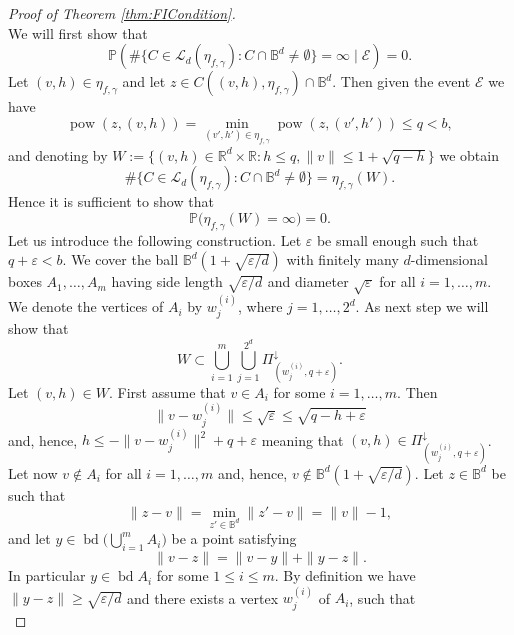 \documentclass[11pt,a4paper]{article}
\theoremstyle{plain}
\theoremstyle{definition}
\theoremstyle{remark}
\def\BB{\mathbb{B}}
\def\PP{\mathbb{P}}
\def\RR{\mathbb{R}}
\def\cL{\mathcal{L}}
\newcommand{\pow}{\mathop{\mathrm{pow}}\nolimits}
\newcommand{\bd}{\operatorname{bd}}
\begin{document}
\begin{proof}[Proof of Theorem \ref{thm:FICondition}]
\begin{equation}
    \end{equation}
    We will first show that 
    \begin{equation}\label{eq:28.05.24_1}
        \PP(\#\{C\in \cL_d(\eta_{f,\gamma}): C\cap \BB^d \neq \emptyset\}=\infty\mid \mathcal{E})=0.
    \end{equation}
    Let $(v,h)\in \eta_{f,\gamma}$ and let $z\in C((v,h),\eta_{f,\gamma})\cap \BB^d$. Then given the event $\mathcal{E}$ we have 
    \[
        \pow(z,(v,h))=\min_{(v',h')\in \eta_{f,\gamma}} \pow(z,(v',h'))\le q<b,
    \]
    and denoting by $W:=\{(v,h)\in \RR^d\times \RR\colon h\leq q, \|v\|\leq 1+\sqrt{q-h}\}$ we obtain
    \[
        \#\{C\in \cL_d(\eta_{f,\gamma}): C\cap \BB^d \neq \emptyset\}=\eta_{f,\gamma}(W).
    \]
    Hence it is sufficient to show that 
    \[
        \PP\big(\eta_{f,\gamma}(W)=\infty\big)=0.
    \] 
    Let us introduce the following construction. Let $\varepsilon$ be small enough such that $q+\varepsilon < b$. We cover the ball $\BB^d(1+\sqrt{\varepsilon/d})$ with finitely many $d$-dimensional boxes $A_1,\ldots,A_m$ having side length $\sqrt{\varepsilon/d}$ and diameter $\sqrt{\varepsilon}$ for all $i=1,\ldots,m$. We denote the vertices of $A_i$ by $w_j^{(i)}$, where $j=1,\ldots,2^d$. As next step we will show that 
    \begin{equation}\label{eq:28.05.24_2}
        W\subset \bigcup_{i=1}^m\bigcup_{j=1}^{2^d}\Pi^{\downarrow}_{(w_j^{(i)},q+\varepsilon)}.
    \end{equation}
    Let $(v,h)\in W$. First assume that $v\in A_i$ for some $i=1,\ldots,m$. Then
    \[
        \|v-w_j^{(i)}\| \le \sqrt{\varepsilon} \le \sqrt{q-h+\varepsilon}
    \]
    and, hence, $h\le -\|v-w_j^{(i)}\|^2+q+\varepsilon$ meaning that $(v,h)\in \Pi_{(w_j^{(i)},q+\varepsilon)}^\downarrow$. Let now $v\notin A_i$ for all $i=1,\ldots,m$ and, hence, $v\notin \BB^d(1+\sqrt{\varepsilon/d})$. Let $z\in \BB^d$ be such that 
    \begin{equation}\label{eq:28.05.24_3}
        \|z-v\|=\min_{z'\in\BB^d}\|z'-v\|=\|v\|-1,
    \end{equation}
    and let $y\in \bd\big(\bigcup_{i=1}^m A_i\big)$ be a point satisfying 
    \begin{equation}\label{eq:28.05.24_4}
        \|v-z\|=\|v-y\|+\|y-z\|.
    \end{equation} 
    In particular $y\in \bd A_i$ for some $1\leq i\leq m$. By definition we have $\|y-z\|\ge \sqrt{\varepsilon/d}$ and there exists a vertex $w_j^{(i)}$ of $A_i$, such that
    \begin{equation}\label{eq:28.05.24_5}

\end{equation}
\end{proof}
\end{document}
